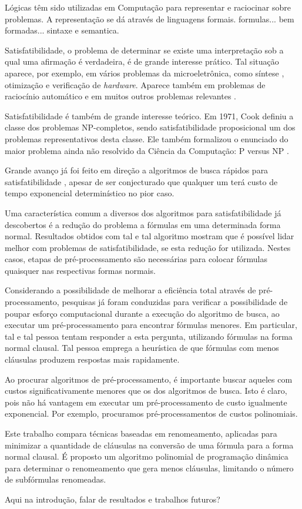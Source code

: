 \indent

Lógicas têm sido utilizadas em Computação para representar e raciocinar sobre problemas. A representação se dá através de linguagens formais. formulas... bem formadas... sintaxe e semantica.

Satisfatibilidade, o problema de determinar se existe uma interpretação sob a qual uma afirmação é verdadeira, é de grande interesse prático. Tal situação aparece, por exemplo, em vários problemas da microeletrônica, como síntese \cite{bloem2014sat}, otimização \cite{gupta2006sat} e verificação \cite{nieuwenhuis2006sat} de \textit{hardware}. Aparece também em problemas de raciocínio automático \cite{harrison2009handbook} e em muitos outros problemas relevantes \cite{horvitz1992automated}.

Satisfatibilidade é também de grande interesse teórico. Em 1971, Cook definiu a classe dos problemas NP-completos, sendo satisfatibilidade proposicional um dos problemas representativos desta classe. Ele também formalizou o enunciado do maior problema ainda não resolvido da Ciência da Computação: P versus NP \cite{cook1971complexity}.

Grande avanço já foi feito em direção a algoritmos de busca rápidos para satisfatibilidade \cite{davis1960computing,davis1962machine,biere2009conflict}, apesar de ser conjecturado que qualquer um terá custo de tempo exponencial determinístico no pior caso.

Uma característica comum a diversos dos algoritmos para satisfatibilidade já descobertos é a redução do problema a fórmulas em uma determinada forma normal. Resultados obtidos com tal e tal algoritmo mostram que é possível lidar melhor com problemas de satisfatibilidade, se esta redução for utilizada. Nestes casos, etapas de pré-processamento são necessárias para colocar fórmulas quaisquer nas respectivas formas normais.

Considerando a possibilidade de melhorar a eficiência total através de pré-processa\-mento, pesquisas já foram conduzidas para verificar a possibilidade de poupar esforço computacional durante a execução do algoritmo de busca, ao executar um pré-processamento para encontrar fórmulas menores. Em particular, tal e tal pessoa tentam responder a esta pergunta, utilizando fórmulas na forma normal clausal. Tal pessoa emprega a heurística de que fórmulas com menos cláusulas produzem respostas mais rapidamente.

Ao procurar algoritmos de pré-processamento, é importante buscar aqueles com custos significativamente menores que os dos algoritmos de busca. Isto é claro, pois não há vantagem em executar um pré-processamento de custo igualmente exponencial. Por exemplo, procuramos pré-processamentos de custos polinomiais.

Este trabalho compara técnicas baseadas em renomeamento, aplicadas para minimizar a quantidade de cláusulas na conversão de uma fórmula para a forma normal clausal. É proposto um algoritmo polinomial de programação dinâmica para determinar o renomeamento que gera menos cláusulas, limitando o número de subfórmulas renomeadas.

Aqui na introdução, falar de resultados e trabalhos futuros?
